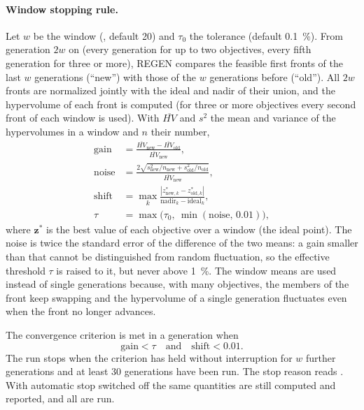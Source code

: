 \paragraph{Window stopping rule.} Let $w$ be the window (, default 20) and $\tau_0$ the tolerance
(default 0.1~\%). From generation $2w$ on (every generation for up to two objectives, every fifth generation for
three or more), REGEN compares the feasible first fronts of the last $w$ generations (``new'') with those of the
$w$ generations before (``old''). All $2w$ fronts are normalized jointly with the ideal and nadir of their union,
and the hypervolume of each front is computed (for three or more objectives every second front of each window is
used). With $\overline{HV}$ and $s^2$ the mean and variance of the hypervolumes in a window and $n$ their number,
\begin{align}
\text{gain}&=\frac{\overline{HV}_\text{new}-\overline{HV}_\text{old}}{\overline{HV}_\text{new}},\label{eq:ch08-gain}\\
\text{noise}&=\frac{2\sqrt{s^2_\text{new}/n_\text{new}+s^2_\text{old}/n_\text{old}}}{\overline{HV}_\text{new}},
\label{eq:ch08-noise}\\
\text{shift}&=\max_k\frac{|z^*_{\text{new},k}-z^*_{\text{old},k}|}{\text{nadir}_k-\text{ideal}_k},\label{eq:ch08-shift}\\
\tau&=\max\bigl(\tau_0,\ \min(\text{noise},\,0.01)\bigr),\label{eq:ch08-tau}
\end{align}
where $\mathbf z^*$ is the best value of each objective over a window (the ideal point). The noise is twice the
standard error of the difference of the two means: a gain smaller than that cannot be distinguished from random
fluctuation, so the effective threshold $\tau$ is raised to it, but never above 1~\%. The window means are used
instead of single generations because, with many objectives, the members of the front keep swapping and the
hypervolume of a single generation fluctuates even when the front no longer advances.

The convergence criterion is met in a generation when
\begin{equation}
\text{gain}<\tau\quad\text{and}\quad\text{shift}<0.01 .
\label{eq:ch08-crit}
\end{equation}
The run stops when the criterion has held without interruption for $w$ further generations and at least 30
generations have been run. The stop reason reads . With automatic stop switched off the same quantities are still computed and reported,
and all  are run.

